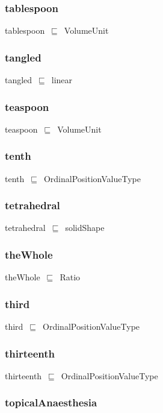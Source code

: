 \documentclass{article}
\begin{document}
\subsubsection*{tablespoon}

tablespoon~\ensuremath{\sqsubseteq}~VolumeUnit~

\subsubsection*{tangled}

tangled~\ensuremath{\sqsubseteq}~linear~

\subsubsection*{teaspoon}

teaspoon~\ensuremath{\sqsubseteq}~VolumeUnit~

\subsubsection*{tenth}

tenth~\ensuremath{\sqsubseteq}~OrdinalPositionValueType~

\subsubsection*{tetrahedral}

tetrahedral~\ensuremath{\sqsubseteq}~solidShape~

\subsubsection*{theWhole}

theWhole~\ensuremath{\sqsubseteq}~Ratio~

\subsubsection*{third}

third~\ensuremath{\sqsubseteq}~OrdinalPositionValueType~

\subsubsection*{thirteenth}

thirteenth~\ensuremath{\sqsubseteq}~OrdinalPositionValueType~

\subsubsection*{topicalAnaesthesia}
\end{document}

